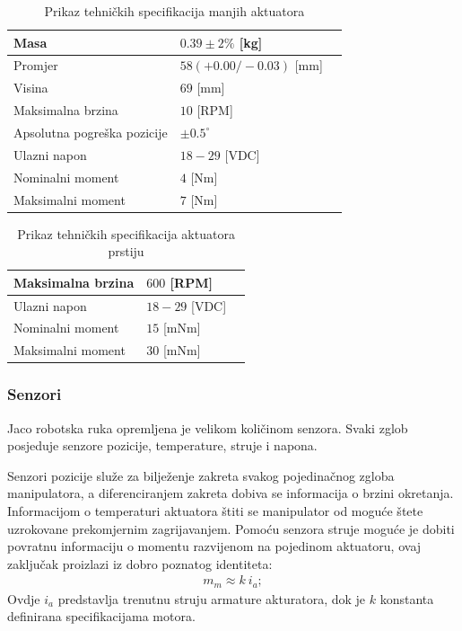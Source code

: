 \documentclass[times, utf8, diplomski, numeric]{fer}
\begin{document}
\begin{table}[h!]
    \centering
    \caption{Prikaz tehničkih specifikacija manjih aktuatora} \label{spec_act_small}
    \begin{tabular}{ | l | l | l |}
    \hline
    Masa & $0.39 \pm 2\%$ [kg] \\ \hline
    Promjer  & $58(+0.00/-0.03)$ [mm] \\ \hline
    Visina & $69$ [mm] \\ \hline
    Maksimalna brzina & $10$ [RPM] \\ \hline
    Apsolutna pogreška pozicije & $\pm0.5^{\circ}$ \\ \hline
    Ulazni napon  & $18 - 29$ [VDC] \\ \hline
    Nominalni moment & $4$ [Nm] \\ \hline
    Maksimalni moment & $7$  [Nm]  \\ \hline
    \end{tabular}
\end{table}

\begin{table}[h!]
    \centering
    \caption{Prikaz tehničkih specifikacija aktuatora prstiju} \label{spec_act_finger}
    \begin{tabular}{ | l | l | l |}
    \hline
    Maksimalna brzina & $600$ [RPM] \\ \hline
    Ulazni napon  & $18 - 29$ [VDC] \\ \hline
    Nominalni moment & $15$ [mNm] \\ \hline
    Maksimalni moment & $30$  [mNm]  \\ \hline
    \end{tabular}
\end{table}

\subsubsection{Senzori}
Jaco robotska ruka opremljena je velikom količinom senzora.
Svaki zglob posjeduje senzore pozicije, temperature, struje i napona.
                                                                                                                            
Senzori pozicije služe za bilježenje zakreta svakog pojedinačnog zgloba manipulatora, a diferenciranjem zakreta dobiva se informacija o brzini okretanja.
Informacijom o temperaturi aktuatora štiti se manipulator od moguće štete uzrokovane prekomjernim zagrijavanjem.
Pomoću senzora struje moguće je dobiti povratnu informaciju o momentu razvijenom na pojedinom aktuatoru, ovaj zaključak proizlazi iz dobro poznatog identiteta:
\begin{align}
m_m \approx k \ i_a;
\end{align}
Ovdje $i_a$ predstavlja trenutnu struju armature akturatora, dok je $k$ konstanta definirana specifikacijama motora.
\end{document}
